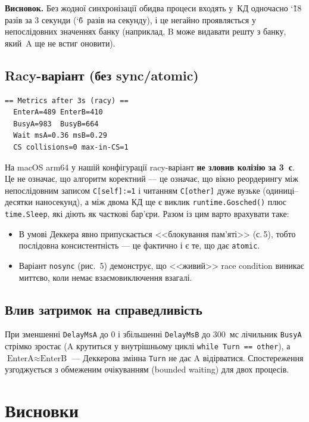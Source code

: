 \documentclass[a4paper,12pt]{article}
\begin{document}
\textbf{Висновок.} Без жодної синхронізації обидва процеси входять у~КД
одночасно \char`\~18 разів за 3 секунди (\char`\~6~разів на секунду),
і це негайно проявляється у непослідовних значеннях банку (наприклад,
B може видавати решту з банку, який~A ще не встиг оновити).

\subsection{Racy-варіант (без sync/atomic)}

\begin{lstlisting}[basicstyle=\ttfamily\footnotesize]
== Metrics after 3s (racy) ==
  EnterA=489 EnterB=410
  BusyA=983  BusyB=664
  Wait msA=0.36 msB=0.29
  CS collisions=0 max-in-CS=1
\end{lstlisting}

На macOS arm64 у нашій конфігурації racy-варіант \textbf{не зловив
колізію за 3~с}. Це не означає, що алгоритм коректний --- це означає,
що вікно реордерингу між непослідовним записом \texttt{C[self]:=1} і
читанням \texttt{C[other]} дуже вузьке (одиниці--десятки наносекунд),
а між двома КД ще є виклик \texttt{runtime.Gosched()} плюс
\texttt{time.Sleep}, які діють як часткові бар'єри. Разом із цим
варто врахувати таке:
\begin{itemize}
    \item В умові Деккера явно припускається <<блокування пам'яті>>
    (с.\,5), тобто послідовна консистентність --- це фактично і є те,
    що дає \texttt{atomic}.
    \item Варіант \texttt{nosync} (рис.~5) демонструє, що
    <<живий>> race condition виникає миттєво, коли немає
    взаємовиключення взагалі.
\end{itemize}

\subsection{Влив затримок на справедливість}

При зменшенні \texttt{DelayMsA} до 0 і збільшенні \texttt{DelayMsB} до
300~мс лічильник \texttt{BusyA} стрімко зростає (A крутиться у
внутрішньому циклі \texttt{while Turn == other}), а $\text{EnterA}
\approx \text{EnterB}$ --- Деккерова змінна \texttt{Turn} не дає A
відірватися. Спостереження узгоджується з обмеженим очікуванням
(bounded waiting) для двох процесів.

\section{Висновки}
\end{document}
